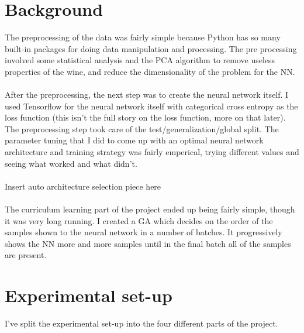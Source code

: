 \documentclass[conference]{IEEEtran}
\begin{document}
\section{Background}
The preprocessing of the data was fairly simple because Python has so many built-in
packages for doing data manipulation and processing. The pre processing involved some
statistical analysis and the PCA algorithm to remove useless properties of the wine, 
and reduce the dimensionality of the problem for the NN.
\\\\
After the preprocessing, the next step was to create the neural network itself.
I used Tensorflow for the neural network itself with categorical cross entropy
as the loss function (this isn't the full story on the loss function, more on that later).
The preprocessing step took care of the test/generalization/global split. The 
parameter tuning that I did to come up with an optimal neural network architecture
and training strategy was fairly emperical, trying different values and seeing
what worked and what didn't.
\\\\
Insert auto architecture selection piece here
\\\\
The curriculum learning part of the project ended up being fairly simple, though
it was very long running. I created a GA which decides on the order
of the samples shown to the neural network in a number of batches.
It progressively shows the NN more and more samples until in the final batch
all of the samples are present.


\section{Experimental set-up}
I've split the experimental set-up into the four different parts of the project.
\end{document}
